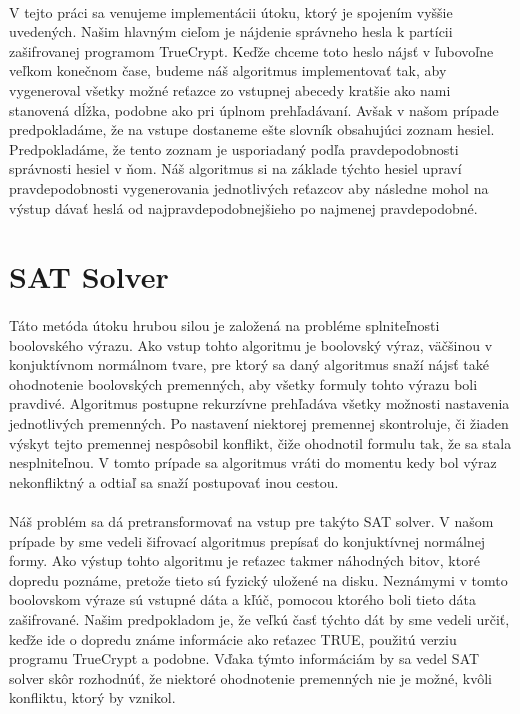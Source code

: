 \paragraph{}
V tejto práci sa venujeme implementácii útoku, ktorý je spojením vyššie uvedených. Našim hlavným cieľom je nájdenie správneho hesla k partícii zašifrovanej programom TrueCrypt. Keďže chceme toto heslo nájsť v ľubovoľne veľkom konečnom čase, budeme náš algoritmus implementovať tak, aby vygeneroval všetky možné reťazce zo vstupnej abecedy kratšie ako nami stanovená dĺžka, podobne ako pri úplnom prehľadávaní. Avšak v našom prípade predpokladáme, že na vstupe dostaneme ešte slovník obsahujúci zoznam hesiel. Predpokladáme, že tento zoznam je usporiadaný podľa pravdepodobnosti správnosti hesiel v ňom. Náš algoritmus si na základe týchto hesiel upraví pravdepodobnosti vygenerovania jednotlivých reťazcov aby následne mohol na výstup dávať heslá od najpravdepodobnejšieho po najmenej pravdepodobné. 

\section{SAT Solver}
\paragraph{}
Táto metóda útoku hrubou silou je založená na probléme splniteľnosti boolovského výrazu. Ako vstup tohto algoritmu je boolovský výraz, väčšinou v konjuktívnom normálnom tvare, pre ktorý sa daný algoritmus snaží nájsť také ohodnotenie boolovských premenných, aby všetky formuly tohto výrazu boli pravdivé. Algoritmus postupne rekurzívne prehľadáva všetky možnosti nastavenia jednotlivých premenných. Po nastavení niektorej premennej skontroluje, či žiaden výskyt tejto premennej nespôsobil konflikt, čiže ohodnotil formulu tak, že sa stala nesplniteľnou. V tomto prípade sa algoritmus vráti do momentu kedy bol výraz nekonfliktný a odtiaľ sa snaží postupovať inou cestou.

\paragraph{}
Náš problém sa dá pretransformovať na vstup pre takýto SAT solver. V našom prípade by sme vedeli šifrovací algoritmus prepísať do konjuktívnej normálnej formy. Ako výstup tohto algoritmu je reťazec takmer náhodných bitov, ktoré dopredu poznáme, pretože tieto sú fyzický uložené na disku. Neznámymi v tomto boolovskom výraze sú vstupné dáta a kľúč, pomocou ktorého boli tieto dáta zašifrované. Našim predpokladom je, že veľkú časť týchto dát by sme vedeli určiť, keďže ide o dopredu známe informácie ako reťazec TRUE, použitú verziu programu TrueCrypt a podobne. Vďaka týmto informáciám by sa vedel SAT solver skôr rozhodnúť, že niektoré ohodnotenie premenných nie je možné, kvôli konfliktu, ktorý by vznikol.

